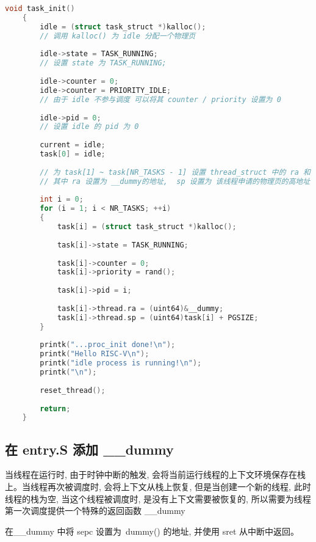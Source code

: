 \documentclass{source/Report}
\begin{document}
\begin{lstlisting}[language = c, title = {线程初始化}]
    void task_init()
    {
        idle = (struct task_struct *)kalloc();
        // 调用 kalloc() 为 idle 分配一个物理页
    
        idle->state = TASK_RUNNING;
        // 设置 state 为 TASK_RUNNING;
    
        idle->counter = 0;
        idle->counter = PRIORITY_IDLE;
        // 由于 idle 不参与调度 可以将其 counter / priority 设置为 0
    
        idle->pid = 0;
        // 设置 idle 的 pid 为 0
    
        current = idle;
        task[0] = idle;
    
        // 为 task[1] ~ task[NR_TASKS - 1] 设置 thread_struct 中的 ra 和 sp,
        // 其中 ra 设置为 __dummy的地址,  sp 设置为 该线程申请的物理页的高地址
    
        int i = 0;
        for (i = 1; i < NR_TASKS; ++i)
        {
            task[i] = (struct task_struct *)kalloc();
    
            task[i]->state = TASK_RUNNING;
    
            task[i]->counter = 0;
            task[i]->priority = rand();
    
            task[i]->pid = i;
    
            task[i]->thread.ra = (uint64)&__dummy;
            task[i]->thread.sp = (uint64)task[i] + PGSIZE;
        }
    
        printk("...proc_init done!\n");
        printk("Hello RISC-V\n");
        printk("idle process is running!\n");
        printk("\n");
    
        reset_thread();
    
        return;
    }
\end{lstlisting}


\subsection{在 entry.S 添加 \_\_dummy}

当线程在运行时, 由于时钟中断的触发, 会将当前运行线程的上下文环境保存在栈上。当线程再次被调度时, 会将上下文从栈上恢复, 但是当创建一个新的线程, 此时线程的栈为空, 当这个线程被调度时, 是没有上下文需要被恢复的, 所以需要为线程第一次调度提供一个特殊的返回函数 \_\_dummy

在\_\_dummy 中将 sepc 设置为\ dummy() 的地址, 并使用 sret 从中断中返回。
\end{document}
